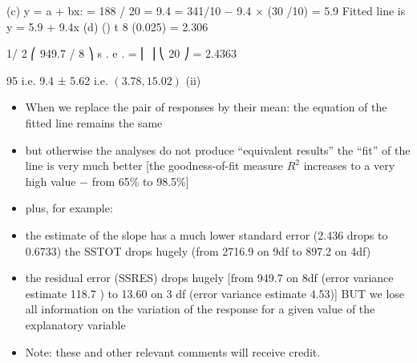 \documentclass[a4paper,12pt]{article}
\begin{document}
(c)
y = a + bx:
 = 188 / 20 = 9.4
= 341/10 − 9.4 × (30 /10) = 5.9
Fitted line is y = 5.9 + 9.4x
(d)
()
t 8 (0.025) = 2.306

1/ 2
⎛ 949.7 / 8 ⎞
s . e .  = ⎜
⎟
⎝ 20 ⎠
= 2.4363

95%
i.e. 9.4 ± 5.62 i.e. $(3.78, 15.02)$
(ii)
\begin{itemize}
\item When we replace the pair of responses by their mean: the equation of the fitted line remains the same
\item but otherwise the analyses do not produce “equivalent results”
the “fit” of the line is very much better [the goodness-of-fit measure $R^2$ increases to a very high value − from 65\% to 98.5\%]
\item plus, for example:
\item the estimate of the slope has a much lower standard error (2.436 drops to 0.6733)
the SSTOT drops hugely (from 2716.9 on 9df to 897.2 on 4df)
\item the residual error (SSRES) drops hugely [from 949.7 on 8df (error variance estimate 118.7 ) to 13.60 on 3 df (error variance estimate 4.53)]
BUT we lose all information on the variation of the response for a given value of the explanatory variable
\item Note: these and other relevant comments will receive credit.
\end{itemize}
\end{document}
